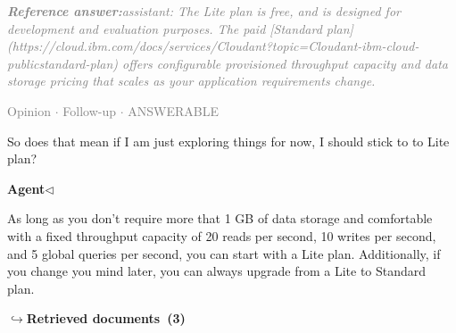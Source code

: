 \documentclass[a4paper,11pt]{article}
\begin{document}
\begin{refanswerenv}
{\footnotesize\textit{\textcolor{gray}{\textbf{Reference answer:}\enspace assistant: The Lite plan is free, and is designed for development and evaluation purposes. The paid [Standard plan](https://cloud.ibm.com/docs/services/Cloudant?topic=Cloudant-ibm-cloud-publicstandard-plan) offers configurable provisioned throughput capacity and data storage pricing that scales as your application requirements change.}}}
\end{refanswerenv}
\vspace{0.5em}
\hfill{\tiny\textcolor{gray}{Opinion $\cdot$ Follow-up $\cdot$ ANSWERABLE}}
\begin{userbubble}
So does that mean if I am just exploring things for now, I should stick to to Lite plan? 
\end{userbubble}
\noindent\hfill{\small\textcolor{agentcolor}{\textbf{Agent\enspace$\triangleleft$}}}
\begin{agentbubble}
As long as you don't require more that 1 GB of data storage and comfortable with a fixed throughput capacity of 20 reads per second, 10 writes per second, and 5 global queries per second, you can start with a Lite plan. Additionally, if you change you mind later, you can always upgrade from a Lite to Standard plan.
\end{agentbubble}
\noindent\hfill{\footnotesize\textcolor{doccolor}{\textbf{$\hookrightarrow$\enspace Retrieved documents~(3)}}}
\end{document}
